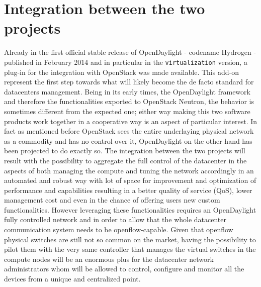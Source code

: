 \section{Integration between the two projects}
Already in the first official stable release of OpenDaylight - codename Hydrogen - published in February 2014 and in particular in the \texttt{virtualization} version, a plug-in for the integration with OpenStack was made available. This add-on represent the first step towards what will likely become the de facto standard for datacenters management. Being in its early times, the OpenDaylight framework and therefore the functionalities exported to OpenStack Neutron, the behavior is sometimes different from the expected one; either way making this two software products work together in a cooperative way is an aspect of particular interest. In fact as mentioned before OpenStack sees the entire underlaying physical network as a commodity and has no control over it, OpenDaylight on the other hand has been projected to do exactly so.
The integration between the two projects will result with the possibility to aggregate the full control of the datacenter in the aspects of both managing the compute and tuning the network accordingly in an automated and robust way with lot of space for improvement and optimization of performance and capabilities resulting in a better quality of service (QoS), lower management cost and even in the chance of offering users new custom functionalities.
However leveraging these functionalities requires an OpenDaylight fully controlled network and in order to allow that the whole datacenter communication system needs to be openflow-capable.
Given that openflow physical switches are still not so common on the market, having the possibility to pilot them with the very same controller that manages the virtual switches in the compute nodes will be an enormous plus for the datacenter network administrators whom will be allowed to control, configure and monitor all the devices from a unique and centralized point.
